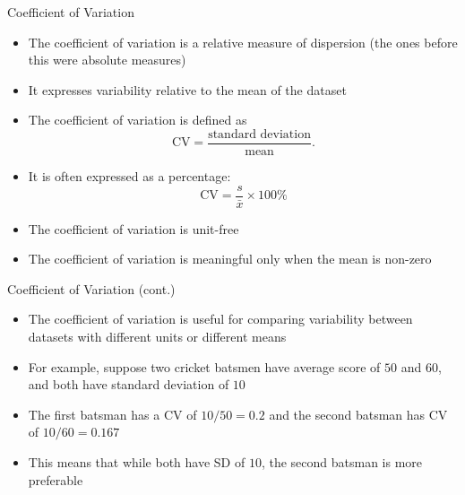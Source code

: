 \documentclass[12pt, aspectratio=169]{beamer}
\begin{document}
    \begin{frame}{Coefficient of Variation}
        \begin{itemize}
            \item The coefficient of variation is a relative measure of dispersion (the ones before this were absolute measures)
            \item It expresses variability relative to the mean of the dataset
            \item The coefficient of variation is defined as
            \[
                \text{CV} = \frac{\text{standard deviation}}{\text{mean}}.
            \]
            \item It is often expressed as a percentage:
            \[
                \text{CV} = \frac{s}{\bar{x}} \times 100\%
            \]
            \item The coefficient of variation is unit-free
            \item The coefficient of variation is meaningful only when the mean is non-zero
        \end{itemize}
    \end{frame}


    \begin{frame}{Coefficient of Variation (cont.)}
        \begin{itemize}
            \item The coefficient of variation is useful for comparing variability between datasets with different units or different means
            \item For example, suppose two cricket batsmen have average score of $50$ and $60$, and both have standard deviation of $10$
            \item The first batsman has a CV of $10/50=0.2$ and the second batsman has CV of $10/60=0.167$
            \item This means that while both have SD of $10$, the second batsman is more preferable
        \end{itemize}
    \end{frame}
\end{document}
